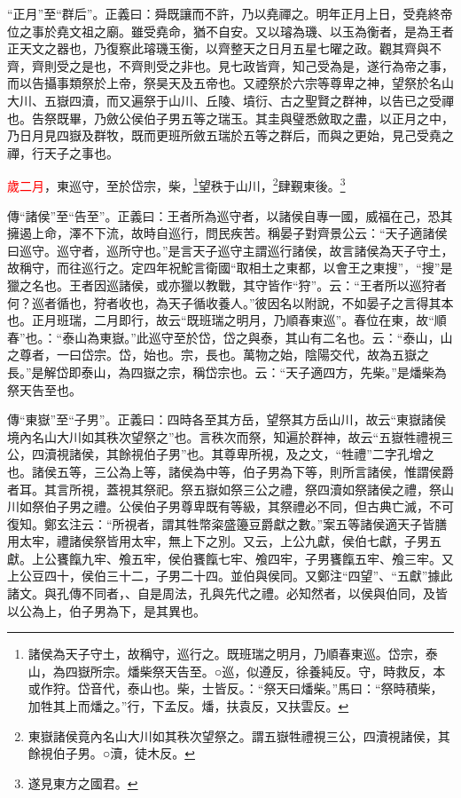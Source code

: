 {\noindent\shu{}\fzkt “正月”至“群后”。正義曰：舜既讓而不許，乃以堯禪之。明年正月上日，受堯終帝位之事於堯文祖之廟。雖受堯命，猶不自安。又以璿為璣、以玉為衡者，是為王者正天文之器也，乃復察此璿璣玉衡，以齊整天之日月五星七曜之政。觀其齊與不齊，齊則受之是也，不齊則受之非也。見七政皆齊，知己受為是，遂行為帝之事，而以告攝事類祭於上帝，祭昊天及五帝也。又禋祭於六宗等尊卑之神，望祭於名山大川、五嶽四瀆，而又遍祭于山川、丘陵、墳衍、古之聖賢之群神，以告已之受禪也。告祭既畢，乃斂公侯伯子男五等之瑞玉。其圭與璧悉斂取之盡，以正月之中，乃日月見四嶽及群牧，既而更班所斂五瑞於五等之群后，而與之更始，見己受堯之禪，行天子之事也。 \par}

\textcolor{red}{歲二月}，東巡守，至於岱宗，柴，\footnote{諸侯為天子守土，故稱守，巡行之。既班瑞之明月，乃順春東巡。岱宗，泰山，為四嶽所宗。燔柴祭天告至。○巡，似遵反，徐養純反。守，時救反，本或作狩。岱音代，泰山也。柴，士皆反。：“祭天曰燔柴。”馬曰：“祭時積柴，加牲其上而燔之。”行，下孟反。燔，扶袁反，又扶雲反。}望秩于山川，\footnote{東嶽諸侯竟內名山大川如其秩次望祭之。謂五嶽牲禮視三公，四瀆視諸侯，其餘視伯子男。○瀆，徒木反。}肆覲東後。\footnote{遂見東方之國君。}

{\noindent\zhuan{}\fzbyks 傳“諸侯”至“告至”。正義曰：王者所為巡守者，以諸侯自專一國，威福在己，恐其擁遏上命，澤不下流，故時自巡行，問民疾苦。稱晏子對齊景公云：“天子適諸侯曰巡守。巡守者，巡所守也。”是言天子巡守主謂巡行諸侯，故言諸侯為天子守土，故稱守，而往巡行之。定四年祝鮀言衛國“取相土之東都，以會王之東搜”，“搜”是獵之名也。王者因巡諸侯，或亦獵以教戰，其守皆作“狩”。云：“王者所以巡狩者何？巡者循也，狩者收也，為天子循收養人。”彼因名以附說，不如晏子之言得其本也。正月班瑞，二月即行，故云“既班瑞之明月，乃順春東巡”。春位在東，故“順春”也。：“泰山為東嶽。”此巡守至於岱，岱之與泰，其山有二名也。云：“泰山，山之尊者，一曰岱宗。岱，始也。宗，長也。萬物之始，陰陽交代，故為五嶽之長。”是解岱即泰山，為四嶽之宗，稱岱宗也。云：“天子適四方，先柴。”是燔柴為祭天告至也。 \par}

{\noindent\zhuan{}\fzbyks 傳“東嶽”至“子男”。正義曰：四時各至其方岳，望祭其方岳山川，故云“東嶽諸侯境內名山大川如其秩次望祭之”也。言秩次而祭，知遍於群神，故云“五嶽牲禮視三公，四瀆視諸侯，其餘視伯子男”也。其尊卑所視，及之文，“牲禮”二字孔增之也。諸侯五等，三公為上等，諸侯為中等，伯子男為下等，則所言諸侯，惟謂侯爵者耳。其言所視，蓋視其祭祀。祭五嶽如祭三公之禮，祭四瀆如祭諸侯之禮，祭山川如祭伯子男之禮。公侯伯子男尊卑既有等級，其祭禮必不同，但古典亡滅，不可復知。鄭玄注云：“所視者，謂其牲幣粢盛籩豆爵獻之數。”案五等諸侯適天子皆膳用太牢，禮諸侯祭皆用太牢，無上下之別。又云，上公九獻，侯伯七獻，子男五獻。上公饔餼九牢、飧五牢，侯伯饔餼七牢、飧四牢，子男饔餼五牢、飧三牢。又上公豆四十，侯伯三十二，子男二十四。並伯與侯同。又鄭注“四望”、“五獻”據此諸文。與孔傳不同者，、自是周法，孔與先代之禮。必知然者，以侯與伯同，及皆以公為上，伯子男為下，是其異也。 \par}


